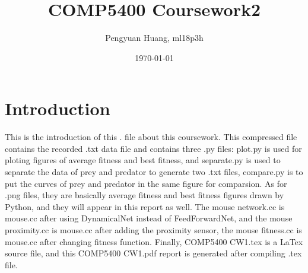 \documentclass{article}
\title{COMP5400 Coursework2}
\author{Pengyuan Huang, ml18p3h}
\date{\today}
\begin{document}
\maketitle

\section{Introduction}
This is the introduction of this . file about this coursework. This compressed file contains the recorded .txt data file and contains three .py files: plot.py is used for ploting figures of average fitness and best fitness, and separate.py is used to separate the data of prey and predator to generate two .txt files, compare.py is to put the curves of prey and predator in the same figure for comparsion. As for .png files, they are basically average fitness and best fitness figures drawn by Python, and they will appear in this report as well. The mouse network.cc is mouse.cc after using DynamicalNet instead of FeedForwardNet, and the mouse proximity.cc is mouse.cc after adding the proximity sensor, the mouse fitness.cc is mouse.cc after changing fitness function. Finally, COMP5400 CW1.tex is a LaTex source file, and this COMP5400 CW1.pdf report is generated after compiling .tex file.
\end{document}

